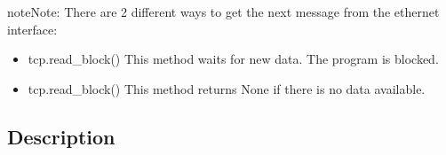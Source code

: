 \documentclass[letterpaper,10pt,english]{sphinxmanual}
\begin{document}
\begin{notice}{note}{Note:}
There are 2 different ways to get the next message from the ethernet interface:
\begin{itemize}
\item {} 
tcp.read\_block()  This method waits for new data. The program is blocked.

\item {} 
tcp.read\_block()  This method returns None if there is no data available.

\end{itemize}
\end{notice}


\subsection{Description}
\label{libraries:id2}\label{libraries:module-libraries.ethernet}
\end{document}
